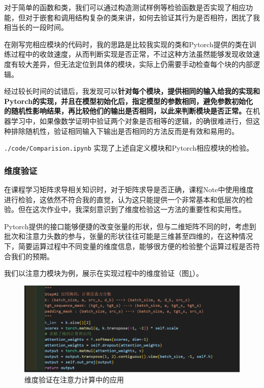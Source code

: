 对于简单的函数和类，我们可以通过构造测试样例等检验函数是否实现了相应功能，但对于嵌套和调用结构复杂的类来讲，如何去验证其行为是否相符，困扰了我相当长的一段时间。

在刚写完相应模块的代码时，我的思路是比较我实现的类和Pytorch提供的类在训练过程中的收敛速度，从而判断实现是否正常，不过这种方法虽然能够发现收敛速度有较大差异，但无法定位到具体的模块，实际上仍需要手动检查每个块的内部逻辑。

经过较长时间的试错后，我发现可以\textbf{针对每个模块，提供相同的输入给我的实现和Pytorch的实现，并且在模型初始化后，指定模型的参数相同，避免参数初始化的随机性影响结果，再比较他们的输出是否相同，以此来判断模块是否正常。}在机器学习中，如果像数学证明中验证两个对象是否相等的逻辑，的确很难进行，但这种排除随机性，验证相同输入下输出是否相同的方法反而是有效和易用的。

\texttt{./code/Comparision.ipynb} 实现了上述自定义模块和Pytorch相应模块的检验。

\subsubsection{维度验证}

在课程学习矩阵求导相关知识时，对于矩阵求导是否正确，课程Note中使用维度进行检验，这依然不符合我的直觉，认为这只能提供一个非常基本和低层次的检验。但在这次作业中，我深刻意识到了维度检验这一方法的重要性和实用性。

Pytorch提供的接口能够便捷的改变张量的形状，但与二维矩阵不同的时，考虑到批次和注意力头数的参与，张量的形状往往可能是三维甚至四维的，在这种情况下，简要运算过程中不同变量的维度信息，能够很方便的检验整个运算过程是否符合我们的预期。

我们以注意力模块为例，展示在实现过程中的维度验证（图\ref{fig:simpleT-dimension}）。
\begin{figure}[h]
    \centering
    \includegraphics[width=\linewidth]{img/simpleT/simpleT-dimension.png}
    \caption{维度验证在注意力计算中的应用}
    \label{fig:simpleT-dimension}
\end{figure}

